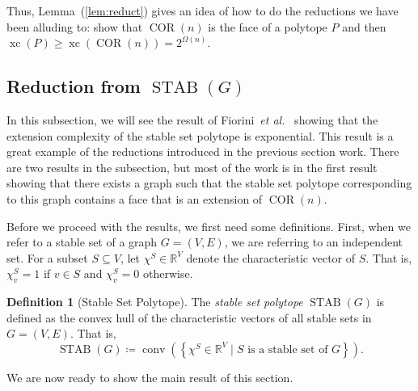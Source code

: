 \documentclass{article}
\makeatletter
\theoremstyle{definition}
\newtheorem{definition}[theorem]{Definition}
\theoremstyle{remark}
\newcommand{\cetal}{\textit{et al.\@}}  %
\newcommand{\conv}{\operatorname{conv}}
\newcommand{\xc}{\operatorname{xc}}
\newcommand{\STAB}{\operatorname{STAB}}
\newcommand{\COR}{\operatorname{COR}}
\renewcommand{\R}{\mathbb{R}}
\makeatother
\begin{document}
Thus, Lemma~(\ref{lem:reduct}) gives an idea of how to do the reductions we have been alluding to: show that $\COR(n)$ is the face of a polytope $P$ and then $\xc(P) \ge \xc(\COR(n)) =2^{\Omega(n)}$.


\subsection{Reduction from $\STAB(G)$}\label{sec:stab}

In this subsection, we will see the result of Fiorini~\cetal~\cite{fiorini} showing that the extension complexity of the stable set polytope is exponential. This result is a great example of the reductions introduced in the previous section work. There are two results in the subsection, but most of the work is in the first result showing that there exists a graph such that the stable set polytope corresponding to this graph contains a face that is an extension of $\COR(n)$. 

Before we proceed with the results, we first need some definitions. First, when we refer to a stable set of a graph $G = (V,E)$, we are referring to an independent set. For a subset $S \subseteq V$, let $\chi^S \in \R^V$ denote the characteristic vector of $S$. That is, $\chi_v^S = 1$ if $v \in S$ and $\chi_v^S = 0$ otherwise. 

\begin{definition}[Stable Set Polytope]
The \emph{stable set polytope} $\STAB(G)$ is defined as the convex hull of the characteristic vectors of all stable sets in $G = (V, E)$. That is,
\[
\STAB(G) \coloneqq \conv\left(\left\{\chi^S \in \R^V \mid S \text{ is a stable set of $G$}\right\}\right).
\]
\end{definition}

We are now ready to show the main result of this section.
\end{document}
